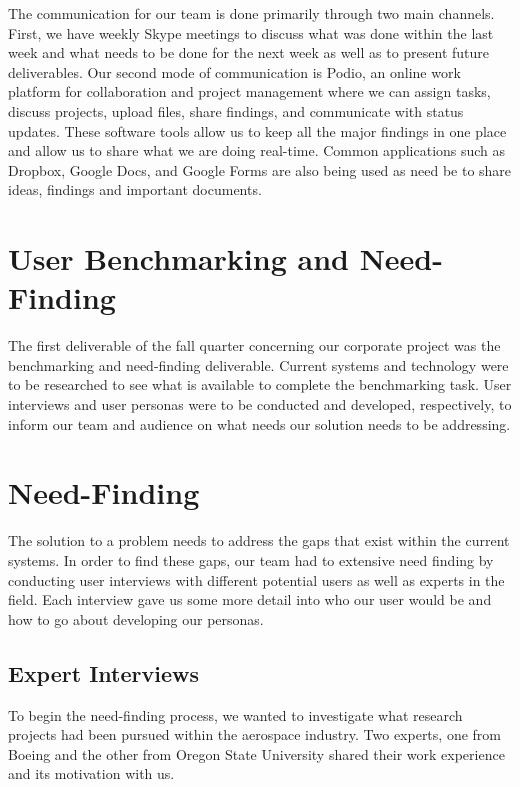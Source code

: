 \documentclass[a4paper, 12pt,conference]{new_cit_thesis}
\begin{document}
The communication for our team is done primarily through two main channels.  First, we have weekly Skype meetings to discuss what was done within the last week and what needs to be done for the next week as well as to present future deliverables.  Our second mode of communication is Podio, an online work platform for collaboration and project management where we can assign tasks, discuss projects, upload files, share findings, and communicate with status updates. These software tools allow us to keep all the major findings in one place and allow us to share what we are doing real-time.  Common applications such as Dropbox, Google Docs, and Google Forms are also being used as need be to share ideas, findings and important documents. 

\section{User Benchmarking and Need-Finding}
The first deliverable of the fall quarter concerning our corporate project was the benchmarking and need-finding deliverable.  Current systems and technology were to be researched to see what is available to complete the benchmarking task.  User interviews and user personas were to be conducted and developed, respectively, to inform our team and audience on what needs our solution needs to be addressing. 

\section{Need-Finding}
The solution to a problem needs to address the gaps that exist within the current systems. In order to find these gaps, our team had to extensive need finding by conducting user interviews with different potential users as well as experts in the field.  Each interview gave us some more detail into who our user would be and how to go about developing our personas.

\subsection{Expert Interviews}
To begin the need-finding process, we wanted to investigate what research projects had been pursued within the aerospace industry. Two experts, one from Boeing and the other from Oregon State University shared their work experience and its motivation with us. 
\end{document}
